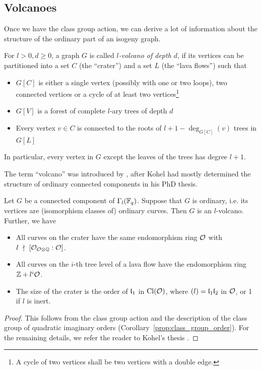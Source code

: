 \subsection{Volcanoes}
Once we have the class group action, we can derive a lot of information about the structure of the ordinary part of an isogeny graph.
\begin{definition}
    For $l > 0, d \geq 0$, a graph $G$ is called \emph{$l$-volcano of depth $d$}, if its vertices can be partitioned into a set $C$ (the ``crater'') and a set $L$ (the ``lava flows'') such that
    \begin{itemize}
        \item $G[C]$ is either a single vertex (possibly with one or two loops), two connected vertices or a cycle of at least two vertices\footnote{A cycle of two vertices shall be two vertices with a double edge.}
        \item $G[V]$ is a forest of complete $l$-ary trees of depth $d$
        \item Every vertex $v \in C$ is connected to the roots of $l + 1 - \deg_{G[C]}(v)$ trees in $G[L]$
    \end{itemize}
    In particular, every vertex in $G$ except the leaves of the trees has degree $l + 1$.
\end{definition}
The term ``volcano'' was introduced by \cite{isogeny_vulcano}, after Kohel had mostly determined the structure of ordinary connected components in his PhD thesis.
\begin{theorem}
    \label{prop:isogeny_vulcano}
    Let $G$ be a connected component of $\Gamma_l(\mathbb{F}_q)$.
    Suppose that $G$ is ordinary, i.e. its vertices are (isomorphism classes of) ordinary curves.
    Then $G$ is an $l$-volcano.
    Further, we have
    \begin{itemize}
        \item All curves on the crater have the same endomorphism ring $\mathcal{O}$ with $l \ \nmid \  [\mathcal{O}_{\mathcal{O} \otimes \mathbb{Q}} : \mathcal{O}]$.
        \item All curves on the $i$-th tree level of a lava flow have the endomorphism ring $\mathbb{Z} + l^i\mathcal{O}$.
        \item The size of the crater is the order of $\mathfrak{l}_1$ in $\mathrm{Cl}(\mathcal{O})$, where $(l) = \mathfrak{l}_1\mathfrak{l}_2$ in $\mathcal{O}$, or 1 if $l$ is inert.
    \end{itemize} 
\end{theorem}
\begin{proof}
    This follows from the class group action and the description of the class group of quadratic imaginary orders (Corollary~\ref{prop:class_group_order}).
    For the remaining details, we refer the reader to Kohel's thesis \cite[Prop.~23]{kohel}.
\end{proof}
